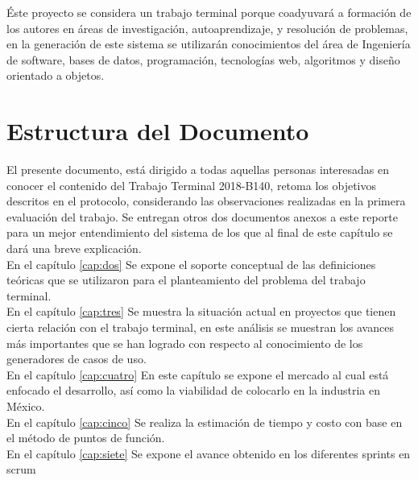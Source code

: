 Éste proyecto se considera un trabajo terminal porque coadyuvará a formación de los autores en áreas de investigación, autoaprendizaje, y resolución de problemas,  en la generación de este sistema se utilizarán conocimientos del área de Ingeniería de software, bases de datos, programación, tecnologías web, algoritmos y diseño orientado a objetos.

\section{Estructura del Documento}

El presente documento, está dirigido a todas aquellas personas interesadas en conocer el contenido del Trabajo Terminal 2018-B140, retoma los objetivos descritos en el protocolo, considerando las observaciones realizadas en la primera evaluación del trabajo. Se entregan otros dos documentos anexos a este reporte para un mejor entendimiento del sistema de los que al final de este capítulo se dará una breve explicación.\\

En el capítulo  \ref{cap:dos} Se expone el soporte conceptual de las definiciones teóricas que se utilizaron para el planteamiento del problema del trabajo terminal. \\

En el capítulo  \ref{cap:tres} Se muestra la situación actual en proyectos que tienen cierta relación con el trabajo terminal, en este análisis se muestran los avances más importantes que se han logrado con respecto al conocimiento de los generadores de casos de uso.\\

En el capítulo  \ref{cap:cuatro} En este capítulo se expone el mercado al cual está enfocado
el desarrollo, así como la viabilidad de colocarlo en la industria en México.\\

En el capítulo  \ref{cap:cinco} Se realiza la estimación de tiempo y costo con base en el método de puntos de función.\\

En el capítulo  \ref{cap:siete} Se expone el avance obtenido en los diferentes sprints en scrum \\